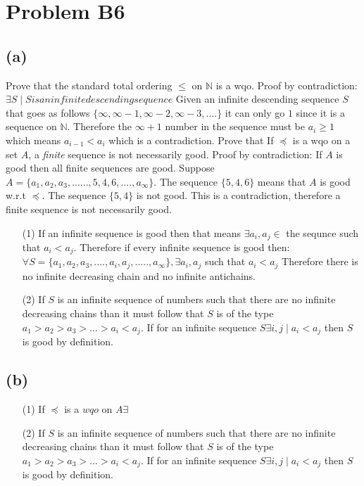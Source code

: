 \documentclass[12pt]{article}
\begin{document}
\section*{Problem B6}
\subsection*{(a)}
Prove that the standard total ordering $\leq$ on $\mathbb{N}$ is a wqo.\newline
\indent Proof by contradiction: $\exists S \mid S is an infinite descending sequence$
Given an infinite descending sequence $S$ that goes as follows $\{\infty , \infty - 1, \infty -2, \infty-3, ....\}$ it can only go $1$ since it is a sequence on $\mathbb{N}$.
Therefore the $\infty+1$ number in the sequence must be $a_i \ge 1$ which means $a_{i-1} < a_i$ which is a contradiction.\newline
Prove that If  $\preceq$ is a wqo on a set $A$, a {\it finite\/}
sequence is not  necessarily good.\newline
\indent Proof by contradiction: If $A$ is good then all finite sequences are good.
Suppose $A = \{a_1 , a_2 , a_3 , ...... , 5 , 4 , 6 , .... , a_\infty\}$.  The sequence $\{5,4,6\}$ means that $A$ is good w.r.t $\preceq$.
The sequence $\{5,4\}$ is not good.
This is a contradiction, therefore a finite sequence is not necessarily good.
\begin{enumerate}
\item[(1)]
If an infinite sequence is good then that means $\exists a_i,a_j \in$ the sequnce such that $a_i < a_j$.  Therefore if every infinite sequence is good then: $\forall S = \{a_1 , a_2 , a_3 , .... , a_i , a_j , ..... , a_\infty\} ,  \exists a_i , a_j$ such that $a_i < a_j$
Therefore there is no infinite decreasing chain and no infinite antichains.
\item[(2)]
If $S$ is an infinite sequence of numbers such that there are no infinite decreasing chains than it must follow that $S$ is of the type $a_1 > a_2 > a_3 > ... > a_i < a_j$.  If for an infinite sequence $S \exists i , j \mid a_i < a_j$ then $S$ is good by definition.
\end{enumerate}
\subsection*{(b)}
\begin{enumerate}
\item[(1)]
If $\preceq$ is a $wqo$ on $A \exists $
\item[(2)]
If $S$ is an infinite sequence of numbers such that there are no infinite decreasing chains than it must follow that $S$ is of the type $a_1 > a_2 > a_3 > ... > a_i < a_j$.  If for an infinite sequence $S \exists i , j \mid a_i < a_j$ then $S$ is good by definition.
\end{enumerate}
\end{document}
